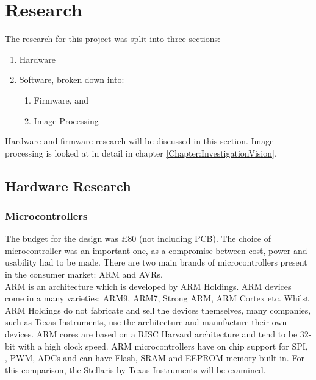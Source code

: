 \chapter{Research} \label{Chapter:Research}
The research for this project was split into three sections:
\begin{enumerate}
\item Hardware
\item Software, broken down into:
\begin{enumerate}
\item Firmware, and
\item Image Processing
\end{enumerate}
\end{enumerate}

Hardware and firmware research will be discussed in this section. Image processing is looked at in detail in chapter \ref{Chapter:InvestigationVision}.
\section{Hardware Research}
\subsection{Microcontrollers}\label{Research:Microcontrollers}
The budget for the design was \pounds 80 (not including PCB). The choice of microcontroller was an important one, as a compromise between cost, power and usability had to be made. There are two main brands of microcontrollers present in the consumer market: ARM and AVRs.\\ %

ARM is an architecture which is developed by ARM Holdings. ARM devices come in a many varieties: ARM9, ARM7, Strong ARM, ARM Cortex etc. Whilst ARM Holdings do not fabricate and sell the devices themselves, many companies, such as Texas Instruments, use the architecture and manufacture their own devices. ARM cores are based on a RISC Harvard architecture and tend to be 32-bit with a high clock speed. ARM microcontrollers have on chip support for SPI, \itc, PWM, ADCs and can have Flash, SRAM and EEPROM memory built-in. For this comparison, the Stellaris by Texas Instruments will be examined. 

